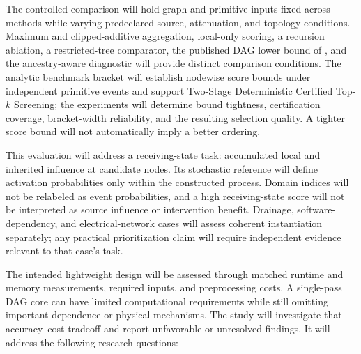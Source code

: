 The controlled comparison will hold graph and primitive inputs fixed across
methods while varying predeclared source, attenuation, and topology conditions.
Maximum and clipped-additive aggregation, local-only scoring, a recursion
ablation, a restricted-tree comparator, the published DAG lower bound of
\citet{abbe2020}, and the ancestry-aware diagnostic will provide distinct
comparison conditions. The analytic benchmark bracket will establish nodewise
score bounds under independent primitive events and support Two-Stage
Deterministic Certified Top-$k$ Screening; the experiments will determine
bound tightness, certification coverage, bracket-width reliability, and the
resulting selection quality. A tighter score bound will not automatically
imply a better ordering.

This evaluation will address a receiving-state task: accumulated local and
inherited influence at candidate nodes. Its stochastic reference will define
activation probabilities only within the constructed process. Domain indices
will not be relabeled as event probabilities, and a high receiving-state
score will not be interpreted as source influence or intervention benefit.
Drainage, software-dependency, and electrical-network cases will assess
coherent instantiation separately; any practical prioritization claim will
require independent evidence relevant to that case's task.

The intended lightweight design will be assessed through matched runtime and
memory measurements, required inputs, and preprocessing costs. A single-pass
DAG core can have limited computational requirements while still omitting
important dependence or physical mechanisms. The study will investigate
that accuracy--cost tradeoff and report unfavorable or unresolved findings.
It will address the following research questions:

